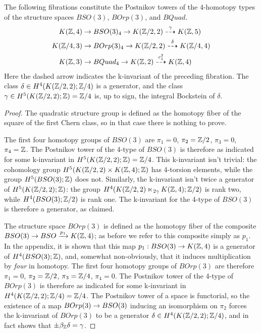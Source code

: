 \documentclass{amsart}
\begin{document}
\begin{proposition}
The following fibrations constitute the Postnikov towers of the 4-homotopy types of the structure spaces $BSO(3)$, $BOrp(3)$, and $BQuad$.
\begin{align}
K(\mathbb Z,4) \rightarrow & \; BSO(3)_4 \rightarrow K(\mathbb Z/2,2) \overset{\gamma}{\dashrightarrow} K(\mathbb Z,5) \nonumber \\
K(\mathbb Z/4,3) \rightarrow & \; BOrp(3)_4 \rightarrow K(\mathbb Z/2,2) \overset{\delta}{\dashrightarrow} K(\mathbb Z/4,4) \nonumber \\
K(\mathbb Z,3) \rightarrow & \; BQuad_4 \rightarrow K(\mathbb Z,2) \overset{c_1^2}{\dashrightarrow} K(\mathbb Z,4) \nonumber
\end{align}
\nid Here the dashed arrow indicates the k-invariant of the preceding fibration.  The class $\delta \in H^4(K(\mathbb Z/2,2);\mathbb Z/4)$ is a generator, and the class $\gamma \in H^5(K(\mathbb Z/2,2);\mathbb Z) = \mathbb Z/4$ is, up to sign, the integral Bockstein of $\delta$. %
\end{proposition}

\begin{proof}
The quadratic structure group is defined as the homotopy fiber of the square of the first Chern class, so in that case there is nothing to prove.

The first four homotopy groups of $BSO(3)$ are $\pi_1 = 0$, $\pi_2 = \mathbb Z/2$, $\pi_3 = 0$, $\pi_4 = \mathbb Z$.  The Postnikov tower of the 4-type of $BSO(3)$ is therefore as indicated for some k-invariant in $H^5(K(\mathbb Z/2,2);\mathbb Z) = \mathbb Z/4$.  This k-invariant isn't trivial: the cohomology group $H^5(K(\mathbb Z/2,2) \times K(\mathbb Z,4);\mathbb Z)$ has 4-torsion elements, while the group $H^5(BSO(3);\mathbb Z)$ does not.  Similarly, the k-invariant isn't twice a generator of $H^5(K(\mathbb Z/2,2);\mathbb Z)$: the group $H^4(K(\mathbb Z/2,2) \ltimes_{2\gamma} K(\mathbb Z,4);\mathbb Z/2)$ is rank two, while $H^4(BSO(3);\mathbb Z/2)$ is rank one.  The k-invariant for the 4-type of $BSO(3)$ is therefore a generator, as claimed.

The structure space $BOrp(3)$ is defined as the homotopy fiber of the composite $BSO(3) \rightarrow BSO \xrightarrow{p_1} K(\mathbb Z,4)$; as before we refer to this composite simply as $p_1$.  In the appendix, it is shown that this map $p_1: BSO(3) \rightarrow K(\mathbb Z,4)$ is a generator of $H^4(BSO(3);\mathbb Z)$, and, somewhat non-obviously, that it induces multiplication by \emph{four} in homotopy.  The first four homotopy groups of $BOrp(3)$ are therefore $\pi_1 = 0$, $\pi_2 = \mathbb Z/2$, $\pi_3 = \mathbb Z/4$, $\pi_4 = 0$.  The Postnikov tower of the 4-type of $BOrp(3)$ is therefore as indicated for some k-invariant in $H^4(K(\mathbb Z/2,2);\mathbb Z/4) = \mathbb Z/4$.  The Postnikov tower of a space is functorial, so the existence of a map $BOrp(3) \rightarrow BSO(3)$ inducing an isomorphism on $\pi_2$ forces the k-invariant of $BOrp(3)$ to be a generator $\delta \in H^4(K(\mathbb Z/2,2);\mathbb Z/4)$, and in fact shows that $\pm \beta_{\mathbb Z} \delta = \gamma$. 
\end{proof}
\end{document}
